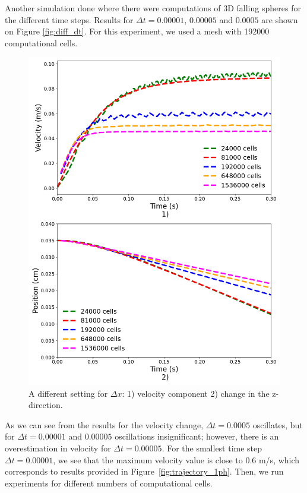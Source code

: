 Another simulation done where there were computations of 3D falling spheres for the different time steps. Results for $\Delta t = 0.00001$, $0.00005$ and $0.0005$ are shown on Figure \ref{fig:diff_dt}. For this experiment, we used a mesh with 192000 computational cells.
\begin{figure}[H]
    \centering
    \includegraphics[width=14cm]{ GWU_Thesis_Sarmakeeva/Images/chap3/nan_simulation_192000_diff_cells_number.png}
    \caption{A different setting for $\Delta x$: 1) velocity component 2) change in the z-direction.}
    \label{fig:cell_num}
\end{figure}
As we can see from the results for the velocity change, $\Delta t = 0.0005$ oscillates, but for $\Delta t = 0.00001$ and $0.00005$ oscillations insignificant; however, there is an overestimation in velocity for $\Delta t = 0.00005$. For the smallest time step $\Delta t = 0.00001$, we see that the maximum velocity value is close to $0.6$ m/s, which corresponds to results provided in Figure~\ref{fig:trajectory_1ph}. Then, we run experiments for different numbers of computational cells.

